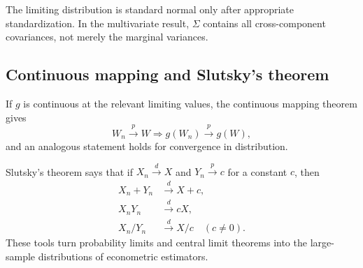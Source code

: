 The limiting distribution is standard normal only after appropriate
standardization.  In the multivariate result, $\Sigma$ contains all
cross-component covariances, not merely the marginal variances.

\subsection{Continuous mapping and Slutsky's theorem}

If $g$ is continuous at the relevant limiting values, the continuous mapping
theorem gives
\[
  W_n\stackrel{p}{\longrightarrow}W
  \Longrightarrow
  g(W_n)\stackrel{p}{\longrightarrow}g(W),
\]
and an analogous statement holds for convergence in distribution.

Slutsky's theorem says that if $X_n\stackrel{d}{\longrightarrow}X$ and
$Y_n\stackrel{p}{\longrightarrow}c$ for a constant $c$, then
\begin{align*}
  X_n+Y_n&\stackrel{d}{\longrightarrow}X+c,\\
  X_nY_n&\stackrel{d}{\longrightarrow}cX,\\
  X_n/Y_n&\stackrel{d}{\longrightarrow}X/c\quad(c\neq0).
\end{align*}
These tools turn probability limits and central limit theorems into the
large-sample distributions of econometric estimators.

